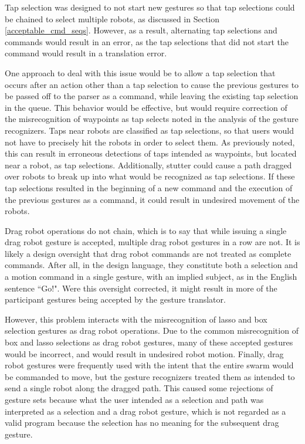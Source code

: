 Tap selection was designed to not start new gestures so that tap selections could be chained to select multiple robots, as discussed in Section \ref{acceptable_cmd_seqs}.
However, as a result, alternating tap selections and commands would result in an error, as the tap selections that did not start the command would result in a translation error.

One approach to deal with this issue would be to allow a tap selection that occurs after an action other than a tap selection to cause the previous gestures to be passed off to the parser as a command, while leaving the existing tap selection in the queue. 
This behavior would be effective, but would require correction of the misrecognition of waypoints as tap selects noted in the analysis of the gesture recognizers.
Taps near robots are classified as tap selections, so that users would not have to precisely hit the robots in order to select them. 
As previously noted, this can result in erroneous detections of taps intended as waypoints, but located near a robot, as tap selections. 
Additionally, stutter could cause a path dragged over robots to break up into what would be recognized as tap selections. 
If these tap selections resulted in the beginning of a new command and the execution of the previous gestures as a command, it could result in undesired movement of the robots. 

Drag robot operations do not chain, which is to say that while issuing a single drag robot gesture is accepted, multiple drag robot gestures in a row are not. 
It is likely a design oversight that drag robot commands are not treated as complete commands. 
After all, in the design language, they constitute both a selection and a motion command in a single gesture, with an implied subject, as in the English sentence ``Go!". 
Were this oversight corrected, it might result in more of the participant gestures being accepted by the gesture translator. 

However, this problem interacts with the misrecognition of lasso and box selection gestures as drag robot operations. 
Due to the common misrecognition of box and lasso selections as drag robot gestures, many of these accepted gestures would be incorrect, and would result in undesired robot motion. 
Finally, drag robot gestures were frequently used with the intent that the entire swarm would be commanded to move, but the gesture recognizers treated them as intended to send a single robot along the dragged path. 
This caused some rejections of gesture sets because what the user intended as a selection and path was interpreted as a selection and a drag robot gesture, which is not regarded as a valid program because the selection has no meaning for the subsequent drag gesture. 

